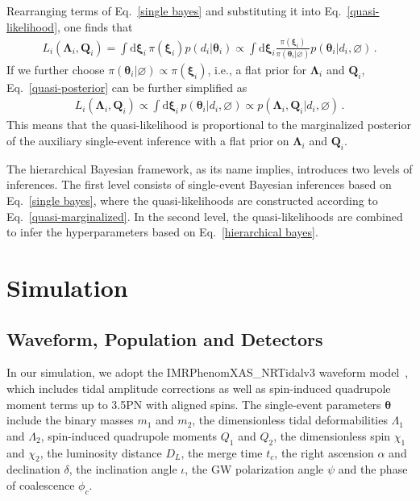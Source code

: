 \documentclass[a4paper,11pt]{article}
\begin{document}
Rearranging terms of Eq.~\eqref{single bayes} and substituting it into
Eq.~\eqref{quasi-likelihood}, one finds that
\begin{equation}
\label{quasi-posterior}
\begin{aligned}
    L_i(\bm{\Lambda}_i,\bm{Q}_i) = \int \text{d}\bm{\xi}_i \,
    \pi(\bm{\xi}_i)p(d_i|\bm{\theta}_i) \propto \int \text{d}\bm{\xi}_i
    \frac{\pi(\bm{\xi}_i)}{\pi(\bm{\theta}_i
    |\varnothing)}p(\bm{\theta}_i|d_i,\varnothing)\,.
\end{aligned}  
\end{equation}
If we further choose $\pi(\bm{\theta}_i|\varnothing) \propto\pi(\bm{\xi}_i)$, 
i.e., a flat prior for $\bm{\Lambda}_i$ and $\bm{Q}_i$,
Eq.~\eqref{quasi-posterior} can be further simplified as 
\begin{equation}
\label{quasi-marginalized}
\begin{aligned}
    L_i(\bm{\Lambda}_i,\bm{Q}_i) \propto \int \text{d} \bm{\xi}_i \,
    p(\bm{\theta}_i|d_i, \varnothing)\propto p(\bm{\Lambda}_i,
    \bm{Q}_i|d_i,\varnothing)\,.
\end{aligned}  
\end{equation}
This means that the quasi-likelihood is proportional to the marginalized
posterior of the auxiliary single-event inference with a flat prior on
$\bm{\Lambda}_i$ and $\bm{Q}_i$. 

The hierarchical Bayesian framework, as its name implies, introduces two levels
of inferences. The first level consists of single-event Bayesian inferences
based on Eq.~\eqref{single bayes}, where the quasi-likelihoods are constructed
according to Eq.~\eqref{quasi-marginalized}. In the second level, the
quasi-likelihoods are combined to infer the hyperparameters based on
Eq.~\eqref{hierarchical bayes}.


\section{Simulation}
\label{sec:simulation}

\subsection{Waveform, Population and Detectors}
\label{subsec:simulation_preliminaries}

In our simulation, we adopt the {\sc IMRPhenomXAS\_NRTidalv3} waveform model~\cite{Abac:2023ujg}, 
which includes tidal amplitude corrections as well as spin-induced quadrupole
moment terms up to 3.5PN with aligned spins.
The single-event parameters $\bm{\theta}$ include 
 the binary masses $m_1$ and $m_2$, the 
dimensionless tidal deformabilities $\Lambda_1$ and $\Lambda_2$, spin-induced 
quadrupole moments $Q_1$ and $Q_2$, the dimensionless spin $\chi_1$ and $\chi_2$, the 
luminosity distance $D_L$, the merge time $t_{c}$, the right ascension $\alpha$ and 
declination $\delta$, the inclination angle $\iota$, the GW polarization angle 
$\psi$ and the phase of coalescence $\phi_{c}$.
\end{document}
